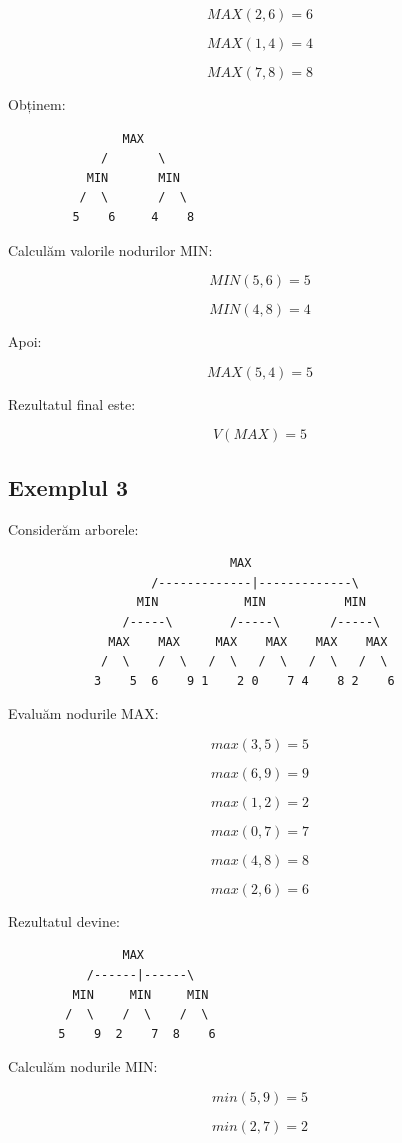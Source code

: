 \documentclass[12pt,a4paper]{article}
\begin{document}
\[
MAX(2,6)=6
\]

\[
MAX(1,4)=4
\]

\[
MAX(7,8)=8
\]

Obținem:

\begin{verbatim}
                MAX
             /       \
           MIN       MIN
          /  \       /  \
         5    6     4    8
\end{verbatim}

Calculăm valorile nodurilor MIN:

\[
MIN(5,6)=5
\]

\[
MIN(4,8)=4
\]

Apoi:

\[
MAX(5,4)=5
\]

Rezultatul final este:

\[
V(MAX)=5
\]

\subsection{Exemplul 3}

Considerăm arborele:

\begin{verbatim}
                               MAX
                    /-------------|-------------\
                  MIN            MIN           MIN
                /-----\        /-----\       /-----\
              MAX    MAX     MAX    MAX    MAX    MAX
             /  \    /  \   /  \   /  \   /  \   /  \
            3    5  6    9 1    2 0    7 4    8 2    6
\end{verbatim}

Evaluăm nodurile MAX:

\[
max(3,5)=5
\]

\[
max(6,9)=9
\]

\[
max(1,2)=2
\]

\[
max(0,7)=7
\]

\[
max(4,8)=8
\]

\[
max(2,6)=6
\]

Rezultatul devine:

\begin{verbatim}
                MAX
           /------|------\
         MIN     MIN     MIN
        /  \    /  \    /  \
       5    9  2    7  8    6
\end{verbatim}

Calculăm nodurile MIN:

\[
min(5,9)=5
\]

\[
min(2,7)=2
\]
\end{document}
